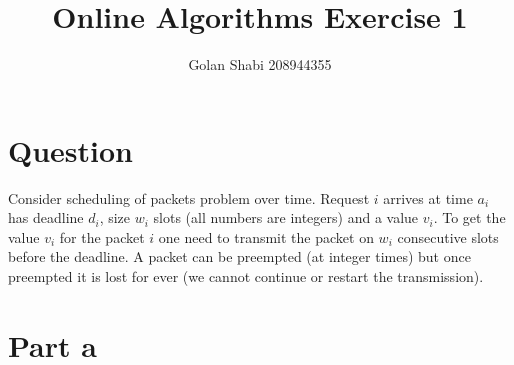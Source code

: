 \documentclass{article}
\title{Online Algorithms Exercise 1}
\author{Golan Shabi 208944355}
\begin{document}
\maketitle
\section*{Question}
Consider scheduling of packets problem over time. Request $i$ arrives at time $a_i$ has deadline $d_i$, size $w_i$ slots (all numbers are integers) and a value $v_i$. To get the value $v_i$ for the packet $i$ one need to transmit the packet on $w_i$ consecutive slots before the deadline. A packet can be preempted (at integer times) but once preempted it is lost for ever (we cannot continue or restart the transmission).\section*{Part a}

\pagebreak


\pagebreak


\pagebreak
\end{document}
